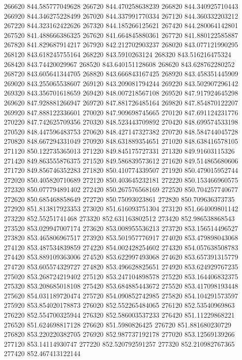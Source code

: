 {266620 844.585777049628
266720 844.470258638239
266820 844.340925710443
266920 844.346275228499
267020 844.337991770334
267120 844.360332203212
267220 844.323162422626
267320 844.185266125621
267420 844.280064142801
267520 841.488666386325
267620 841.664845880361
267720 841.880122585887
267820 841.829687914217
267920 842.212702903237
268020 843.077121990295
268120 843.618245755164
268220 843.5910263124
268320 843.516216475324
268420 843.74420029967
268520 843.640151128608
268620 843.628762280252
268720 843.605641344705
268820 843.666843167425
268920 843.458351445909
269020 843.255065538607
269120 843.209081794244
269220 843.502907296142
269320 843.356701618659
269420 848.007218567108
269520 847.917924645298
269620 847.928881266947
269720 847.881726485164
269820 847.854870122207
269920 847.888122336601
270020 847.909698745665
270120 847.691124231776
270220 847.742625709356
270320 848.523443709892
270420 848.699574533198
270520 848.447596483753
270620 848.427147327382
270720 848.584744045728
270820 848.667294331049
270920 848.631889354651
271020 848.638416578105
271120 850.122735365013
271220 849.845175727331
271320 849.91603115326
271420 849.863555876375
271520 849.586839573612
271620 849.514865680606
271720 849.856746352283
271820 850.410774339507
271920 850.479015952744
272020 850.405820710689
272120 850.403645232181
272220 850.153466960575
272320 850.077794891402
272420 850.267576568169
272520 850.704257740677
272620 850.685468858649
272720 850.75093023861
272820 850.709636373735
272920 851.813817923353
273020 851.616093751304
273120 851.664009801142
273220 852.55251741468
273320 852.631163802512
273420 852.986538868543
273520 853.029947007174
273620 853.008955536213
273720 853.156514496527
273820 853.465806967517
273920 853.501957776917
274020 853.479898043068
274120 853.487534839859
274220 854.002428254602
274320 854.057638508783
274420 853.889109363006
274520 853.622997493068
274620 853.657391315779
274720 853.605574329727
274820 853.496628825651
274920 853.624929767235
275020 853.268724219402
275120 853.247104898578
275220 853.164406832375
275320 853.208685018108
275420 853.684885443672
275520 853.417098193448
275620 854.031189720474
275720 854.090852742985
275820 854.104291573597
275920 853.854020178873
276020 852.552265484065
276120 852.53540969863
276220 852.554700325944
276320 852.586003537233
276420 851.11229868221
276520 851.624698817128
276620 851.5980826425
276720 851.881680230729
276820 853.220220382705
276920 852.987737192178
277020 853.12569139266
277120 853.14114930747
277220 852.520792591257
277320 852.210982767365
277420 852.467413122144
}
